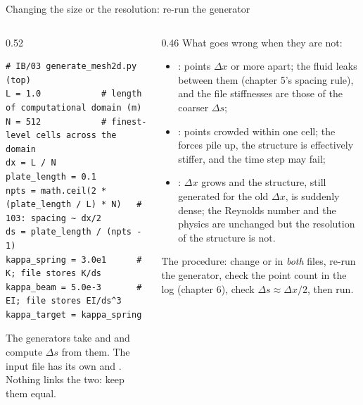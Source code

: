 \documentclass[aspectratio=169,11pt]{beamer}
\begin{document}
\begin{frame}[fragile]{Changing the size or the resolution: re-run the generator}
\label{fr:size}
\begin{columns}[T,onlytextwidth]
\begin{column}{0.52\textwidth}
\begin{lstlisting}[style=pythontiny]
# IB/03 generate_mesh2d.py (top)
L = 1.0            # length of computational domain (m)
N = 512            # finest-level cells across the domain
dx = L / N
plate_length = 0.1
npts = math.ceil(2 * (plate_length / L) * N)   # 103: spacing ~ dx/2
ds = plate_length / (npts - 1)
kappa_spring = 3.0e1      # K; file stores K/ds
kappa_beam = 5.0e-3       # EI; file stores EI/ds^3
kappa_target = kappa_spring
\end{lstlisting}
\footnotesize The generators take  and  and compute $\Delta s$ from them. The input file has its own  and . Nothing links the two:  keep them equal.
\end{column}
\begin{column}{0.46\textwidth}
\footnotesize What goes wrong when they are not:
\begin{itemize}
  \item {}: points $\Delta x$ or more apart; the fluid leaks between them (chapter 5's spacing rule), and the file stiffnesses are those of the coarser $\Delta s$;
  \item {}: points crowded within one cell; the forces pile up, the structure is effectively stiffer, and the time step may fail;
  \item {}: $\Delta x$ grows and the structure, still generated for the old $\Delta x$, is suddenly dense; the Reynolds number and the physics are unchanged but the resolution of the structure is not.
\end{itemize}
\footnotesize The procedure: change  or  in \emph{both} files, re-run the generator, check the point count in the log (chapter 6), check $\Delta s \approx \Delta x/2$, then run.
\end{column}
\end{columns}
\end{frame}
\end{document}
